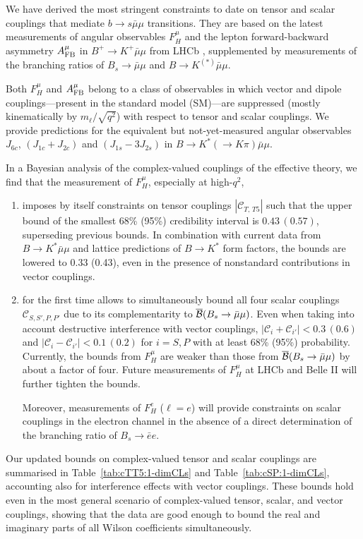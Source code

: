 \documentclass[twocolumn,epjc3]{svjour3}
\numberwithin{equation}{section}
\def \reftab#1{Table~\ref{#1}}
\newcommand{\wilson}[2][{}]{\mathcal{C}_{#2}^{\mathrm{#1}}}
\renewcommand{\[}{\big[}
\renewcommand{\]}{\big]}
\renewcommand{\(}{\big(}
\renewcommand{\)}{\big)}
\begin{document}
We have derived the most stringent constraints to date on tensor and scalar
couplings that mediate $b\to s\bar\mu\mu$ transitions{. They are based on}
the latest
measurements of angular observables $F_H^\mu$ and the lepton forward-backward
asymmetry $A_{\rm FB}^\mu$ in $B^+\to K^+ \bar\mu\mu$ from LHCb
\cite{Aaij:2014tfa}, supplemented by measurements of the branching ratios of
$B_s\to \bar\mu\mu$ and $B\to K^{(*)} \bar\mu\mu$.

Both $F_H^\mu$ and $A_{\rm FB}^\mu$ belong to a class of observables
in which vector and dipole couplings---present in the standard model
(SM)---are suppressed (mostly kinematically by $m_\ell / \sqrt{q^2}$)
with respect to tensor and scalar couplings. We provide predictions
for the equivalent but not-yet-measured angular observables $J_{6c}$,
$(J_{1c} + J_{2c})$ and $(J_{1s} - 3 J_{2s})$ in $B\to K^* (\to K\pi)
\bar\mu\mu$.

In a Bayesian analysis of the complex-valued couplings of the effective theory,
we find that the measurement of $F_H^\mu$, especially at high-$q^2$,
\begin{enumerate}
\item imposes by itself {constraints} on tensor couplings
  $|\wilson{T,\,T5}|$ such that the upper bound of the smallest 68\%
  (95\%) credibility interval is $0.43\, (0.57)$, superseding previous
  bounds.  In combination with current data from $B\to K^* \bar\mu\mu$
  and lattice {predictions of} $B\to K^*$ form factors, the
  bounds are lowered to 0.33 (0.43), even in the presence of
  nonstandard contributions in vector couplings.
  \item for the first time allows to {simultaneously} bound all four scalar couplings
  {$\wilson{S,S',P,P'}$} due to its complementarity to
  $\overline{\cal B}(B_s \to \bar\mu\mu)$. Even when taking into account
  destructive interference with vector couplings, $|\wilson{i} + \wilson{i'}| <
  0.3\, (0.6)$ and $|\wilson{i} - \wilson{i'}| < 0.1\, (0.2)$ for $i = S,P$ with
  at least 68\% (95\%) probability. Currently, the bounds from $F_H^\mu$ are
  weaker than those from $\overline{\cal B}(B_s \to \bar\mu\mu)$ by about a
  factor of four. Future measurements of $F_H^\mu$ at LHCb and Belle II will
  further tighten the bounds.

  Moreover, measurements of $F_H^e$ ($\ell = e$) will provide constraints on
  scalar couplings in the electron channel in the absence of a direct
  determination of the branching ratio of $B_s \to \bar{e}e$.
\end{enumerate}
Our updated bounds on complex-valued tensor and scalar couplings are summarised
in \reftab{tab:cTT5:1-dimCLs} and \reftab{tab:cSP:1-dimCLs}, accounting also for
interference effects with vector couplings. These bounds hold even in the most
general scenario of complex-valued tensor, scalar, and vector couplings, showing
that the data are good enough to bound the real and imaginary parts of all
Wilson coefficients simultaneously.
\end{document}

